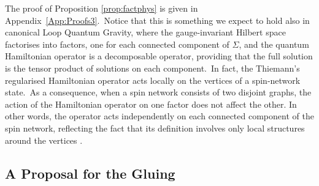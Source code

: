 \documentclass[11pt]{article}
\theoremstyle{definition}
\numberwithin{equation}{section}
\begin{document}
The proof of Proposition \ref{prop:factphys} is given in Appendix~\ref{App:Proofs3}.~Notice that this is something we expect to hold also in canonical Loop Quantum Gravity, where the gauge-invariant Hilbert space factorises into factors, one for each connected component of $\Sigma$, and the quantum Hamiltonian operator is a decomposable operator, providing that the full solution is the tensor product of solutions on each component.~In fact, the Thiemann's regularised Hamiltonian operator acts locally on the vertices of a spin-network state.~As a consequence, when a spin network consists of two disjoint graphs, the action of the Hamiltonian operator on one factor does not affect the other. In other words, the operator acts independently on each connected component of the spin network, reflecting the fact that its definition involves only local structures around the vertices \cite{Thiemann_1998a,Thiemann_1998b,Thiemann_1998c,Thiemann_2007}.

\subsection{A Proposal for the Gluing}\label{Sec:GluingProposal}
 
\end{document}
